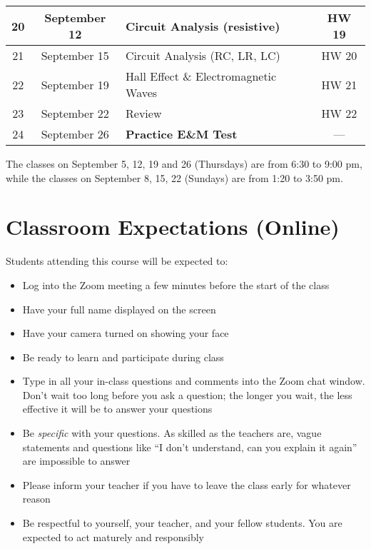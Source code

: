 \documentclass{../../oss-handout}
\begin{document}
\begin{center}
\begin{tabular}{|c|c|p{4in}|c|}
    \hline
    \rowcolor{yellow!50}
    20 & September 12 & Circuit Analysis (resistive) & HW 19 \\
    \hline
    \rowcolor{pink!50}
    21 & September 15 & Circuit Analysis (RC, LR, LC) & HW 20 \\
    \hline
    \rowcolor{yellow!50}
    22 & September 19 & Hall Effect \& Electromagnetic Waves & HW 21 \\
    \hline
    \rowcolor{pink!50}
    23 & September 22 & Review & HW 22 \\
    \hline
    \rowcolor{yellow!50}
    24 & September 26 & \textbf{Practice E\&M Test} & --- \\
    \hline
  \end{tabular}
\end{center}
The classes on September 5, 12, 19 and 26 (Thursdays) are from 6:30 to 9:00 pm,
while the classes on September 8, 15, 22 (Sundays) are from 1:20 to 3:50 pm.
\egroup
\newpage

\section{Classroom Expectations (Online)}
Students attending this course will be expected to:
\begin{itemize}[nosep]
\item Log into the Zoom meeting a few minutes before the start of the class
\item Have your full name displayed on the screen
\item Have your camera turned on showing your face
\item Be ready to learn and participate during class
\item Type in all your in-class questions and comments into the Zoom chat
  window. Don't wait too long before you ask a question; the longer you wait,
  the less effective it will be to answer your questions
\item Be \emph{specific} with your questions. As skilled as the teachers are,
  vague statements and questions like ``I don't understand, can you explain it
  again'' are impossible to answer
\item Please inform your teacher if you have to leave the class early for
  whatever reason
\item Be respectful to yourself, your teacher, and your fellow students. You
  are expected to act maturely and responsibly
\end{itemize}
\end{document}
